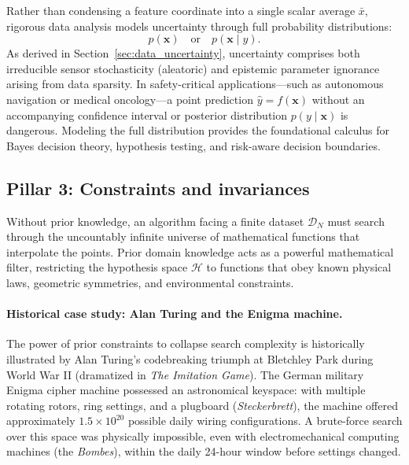 Rather than condensing a feature coordinate into a single scalar average $\bar{x}$, rigorous data analysis models uncertainty through full probability distributions:
\begin{equation}
p(\mathbf{x}) \quad \text{or} \quad p(\mathbf{x} \mid y).
\end{equation}
As derived in Section~\ref{sec:data_uncertainty}, uncertainty comprises both irreducible sensor stochasticity (aleatoric) and epistemic parameter ignorance arising from data sparsity. In safety-critical applications—such as autonomous navigation or medical oncology—a point prediction $\hat{y} = f(\mathbf{x})$ without an accompanying confidence interval or posterior distribution $p(y \mid \mathbf{x})$ is dangerous. Modeling the full distribution provides the foundational calculus for Bayes decision theory, hypothesis testing, and risk-aware decision boundaries.

\subsection{Pillar 3: Constraints and invariances}
\label{sec:pillar_3_prior_knowledge}

Without prior knowledge, an algorithm facing a finite dataset $\mathcal{D}_N$ must search through the uncountably infinite universe of mathematical functions that interpolate the points. Prior domain knowledge acts as a powerful mathematical filter, restricting the hypothesis space $\mathcal{H}$ to functions that obey known physical laws, geometric symmetries, and environmental constraints.

\paragraph{Historical case study: Alan Turing and the Enigma machine.}
The power of prior constraints to collapse search complexity is historically illustrated by Alan Turing's codebreaking triumph at Bletchley Park during World War II (dramatized in \emph{The Imitation Game}). The German military Enigma cipher machine possessed an astronomical keyspace: with multiple rotating rotors, ring settings, and a plugboard (\emph{Steckerbrett}), the machine offered approximately $1.5 \times 10^{20}$ possible daily wiring configurations. A brute-force search over this space was physically impossible, even with electromechanical computing machines (the \emph{Bombes}), within the daily 24-hour window before settings changed.

